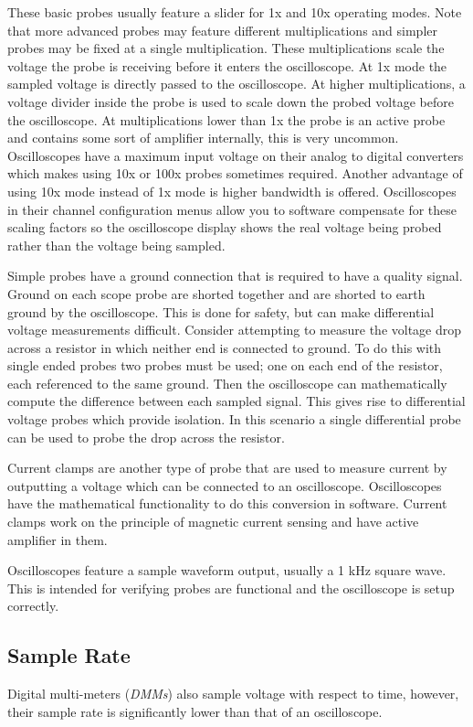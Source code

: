 \documentclass[main.tex]{subfiles}
\begin{document}
These basic probes usually feature a slider for 1x and 10x operating modes. Note that more advanced probes may feature different multiplications and simpler probes may be fixed at a single multiplication. These multiplications scale the voltage the probe is receiving before it enters the oscilloscope. At 1x mode the sampled voltage is directly passed to the oscilloscope. At higher multiplications, a voltage divider inside the probe is used to scale down the probed voltage before the oscilloscope. At multiplications lower than 1x the probe is an active probe and contains some sort of amplifier internally, this is very uncommon. Oscilloscopes have a maximum input voltage on their analog to digital converters which makes using 10x or 100x probes sometimes required. Another advantage of using 10x mode instead of 1x mode is higher bandwidth is offered. Oscilloscopes in their channel configuration menus allow you to software compensate for these scaling factors so the oscilloscope display shows the real voltage being probed rather than the voltage being sampled.

Simple probes have a ground connection that is required to have a quality signal. Ground on each scope probe are shorted together and  are shorted to earth ground by the oscilloscope. This is done for safety, but can make differential voltage measurements difficult. Consider attempting to measure the voltage drop across a resistor in which neither end is connected to ground. To do this with single ended probes two probes must be used; one on each end of the resistor, each referenced to the same ground. Then the oscilloscope can mathematically compute the difference between each sampled signal. This gives rise to differential voltage probes which provide isolation. In this scenario a single differential probe can be used to probe the drop across the resistor.

Current clamps are another type of probe that are used to measure current by outputting a voltage which can be connected to an oscilloscope. Oscilloscopes have the mathematical functionality to do this conversion in software. Current clamps work on the principle of magnetic current sensing and have active amplifier in them.

Oscilloscopes feature a sample waveform output, usually a 1 kHz square wave. This is intended for verifying probes are functional and the oscilloscope is setup correctly.

\subsection{Sample Rate}
Digital multi-meters (\textit{DMMs}) also sample voltage with respect to time, however, their sample rate is significantly lower than that of an oscilloscope.
\end{document}
